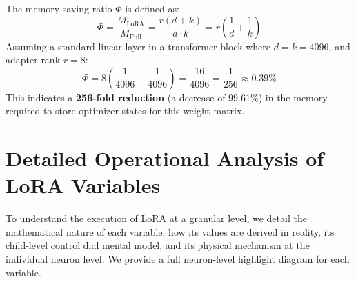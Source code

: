 \documentclass{article}
\begin{document}
\noindent The memory saving ratio $\Phi$ is defined as:
\begin{equation}
  \Phi = \frac{M_{\text{LoRA}}}{M_{\text{Full}}} = \frac{r(d+k)}{d \cdot k} = r \left( \frac{1}{d} + \frac{1}{k} \right)
\end{equation}
Assuming a standard linear layer in a transformer block where $d = k = 4096$, and adapter rank $r = 8$:
\begin{equation}
  \Phi = 8 \left( \frac{1}{4096} + \frac{1}{4096} \right) = \frac{16}{4096} = \frac{1}{256} \approx 0.39\%
\end{equation}
This indicates a \textbf{256-fold reduction} (a decrease of $99.61\%$) in the memory required to store optimizer states for this weight matrix.

\newpage


\section{Detailed Operational Analysis of LoRA Variables}
To understand the execution of LoRA at a granular level, we detail the mathematical nature of each variable, how its values are derived in reality, its child-level control dial mental model, and its physical mechanism at the individual neuron level. We provide a full neuron-level highlight diagram for each variable.
\end{document}
